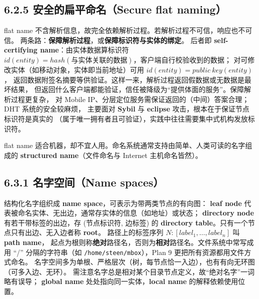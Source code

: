 \subsection*{6.2.5 安全的扁平命名（Secure flat naming）}
flat name 不含解析信息，故完全依赖解析过程。若解析过程不可信，响应也不可信。
两条路：\textbf{保障解析过程}，或\textbf{保障标识符与实体的绑定}。
后者即 \textbf{self-certifying name}：由实体数据算标识符
$id(entity) = hash(\text{与实体关联的数据})$，客户端自行校验收到的数据；
对可修改实体（如移动对象，实体即当前地址）可用 $id(entity) = public\ key(entity)$，
返回数据附签名摘要等供验证。这样一来，解析过程返回假数据或无数据是最坏结果，
但返回什么客户端都能验证，信任被降级为“提供体面的服务”。保障解析过程更复杂，
对 Mobile IP、分层定位服务需保证返回的（中间）答案合理；DHT 系统的安全较麻烦，
主要面对 \textbf{Sybil} 与 \textbf{eclipse} 攻击，根本在于保证节点标识符是真实的
（属于唯一拥有者且可验证），实践中往往需要集中式机构发放标识符。

\begin{closeread}
\end{closeread}



flat name 适合机器，却不宜人用。命名系统通常支持由简单、人类可读的名字组成的
\textbf{structured name}（文件命名与 Internet 主机命名皆然）。

\subsection*{6.3.1 名字空间（Name spaces）}
结构化名字组织成 \textbf{name space}，可表示为带两类节点的有向图：
\textbf{leaf node} 代表被命名实体、无出边，通常存实体的信息（如地址）或状态；
\textbf{directory node} 有若干带标签的出边，存 (节点标识符, 边标签) 的
\textbf{directory table}。只有一个节点只有出边、无入边者称 \textbf{root}。
路径上的标签序列 $N:[label_1,\dots,label_n]$ 叫 \textbf{path name}，
起点为根则称\textbf{绝对}路径名，否则为\textbf{相对}路径名。文件系统中常写成用 “/”
分隔的字符串（如 \texttt{/home/steen/mbox}），Plan 9 更把所有资源都用文件方式命名。
名字空间多为单根、严格层次（树，每节点恰一入边），也有有向无环图（可多入边、无环）。
需注意名字总是相对某个目录节点定义，故“绝对名字”一词略有误导；
\textbf{global name} 处处指向同一实体，\textbf{local name} 的解释依赖使用位置。

